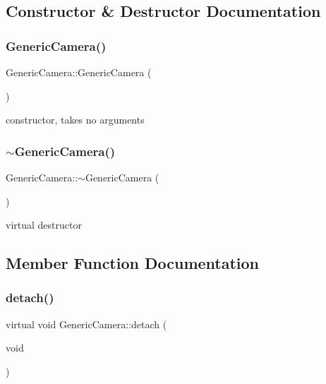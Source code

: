 \subsection{Constructor \& Destructor Documentation}
\mbox{\label{class_generic_camera_ace942cddd443bb28aeee5e49b10aa374}} 
\subsubsection{\texorpdfstring{Generic\+Camera()}{GenericCamera()}}
{\footnotesize\ttfamily Generic\+Camera\+::\+Generic\+Camera (\begin{DoxyParamCaption}{ }\end{DoxyParamCaption})}

constructor, takes no arguments \mbox{\label{class_generic_camera_a8a523a465c0db18b59b6113c6d308962}} 
\subsubsection{\texorpdfstring{$\sim$\+Generic\+Camera()}{~GenericCamera()}}
{\footnotesize\ttfamily Generic\+Camera\+::$\sim$\+Generic\+Camera (\begin{DoxyParamCaption}{ }\end{DoxyParamCaption})\hspace{0.3cm}{\ttfamily [virtual]}}

virtual destructor 

\subsection{Member Function Documentation}
\mbox{\label{class_generic_camera_a86a91e987d6142e5417b2c07542e0aa4}} 
\subsubsection{\texorpdfstring{detach()}{detach()}}
{\footnotesize\ttfamily virtual void Generic\+Camera\+::detach (\begin{DoxyParamCaption}\item[{void}]{ }\end{DoxyParamCaption})\hspace{0.3cm}{\ttfamily [pure virtual]}}


